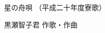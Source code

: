 \documentclass[10pt,b5j]{tarticle} %
\begin{document}
\begin{minipage}[c]{0.7\hsize} %
    \begin{center}
        {\LARGE
            星の舟唄 %
        }
        {\small 
            （平成二十年度寮歌） %
        }
    \end{center}
\end{minipage}
\begin{minipage}[c]{0.3\hsize} %
    \begin{flushright} %
        黒瀬智子君 作歌・作曲 %
    \end{flushright}
\end{minipage}
\end{document}
